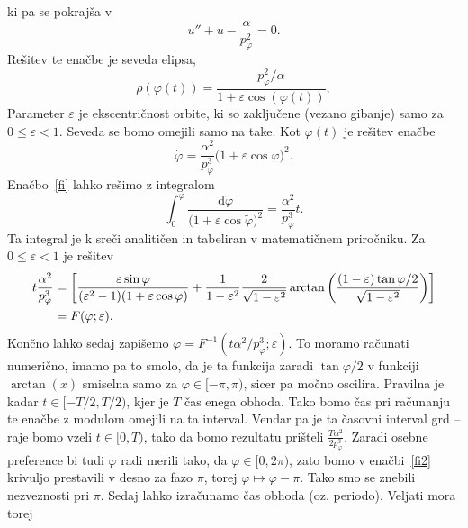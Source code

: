 \documentclass[12pt, a4paper]{article}
\renewcommand{\d}{
    \ensuremath{\mathrm{d}}
}
\begin{document}
ki pa se pokraj\v sa v
\begin{equation}
    u'' + u - \frac{\alpha}{p^2_\varphi} = 0.
\end{equation}
Re\v sitev te ena\v cbe je seveda elipsa,
\begin{equation}
    \rho(\varphi(t)) = \frac{p_\varphi^2/\alpha}{1 + \varepsilon\cos(\varphi(t))},
\end{equation}
Parameter $\varepsilon$ je ekscentri\v cnost orbite, ki so zaklju\v cene (vezano gibanje) samo za
$0 \leq \varepsilon < 1$. Seveda se bomo omejili samo na take.
Kot $\varphi(t)$ je re\v sitev ena\v cbe
\begin{equation}
    \dot{\varphi} = \frac{\alpha^2}{p_\varphi^3}\big(1 + \varepsilon\cos\varphi\big)^2.
    \label{fi}
\end{equation}
Ena\v cbo~\eqref{fi} lahko re\v simo z integralom
\begin{equation}
    \int_0^{\varphi}\frac{\d \tilde{\varphi}}{\big(1 + \varepsilon\cos\tilde{\varphi}\big)^2} = \frac{\alpha^2}{p_\varphi^3}t.
\end{equation}
Ta integral je k sre\v ci analiti\v cen in tabeliran v matemati\v cnem priro\v cniku. Za $0 \leq \varepsilon < 1$ je
re\v sitev
\begin{align}
    t\frac{\alpha^2}{p^3_\varphi} &= \bigg[\frac{\varepsilon\sin\varphi}{(\varepsilon^2 - 1)(1 + \varepsilon\cos\varphi)}
            +\frac{1}{1 - \varepsilon^2}\frac{2}{\sqrt{1 - \varepsilon^2}}\arctan\bigg(\frac{(1 - \varepsilon)\tan\varphi/2}
            {\sqrt{1 - \varepsilon^2}}\bigg)\bigg] \notag \\
        &= F(\varphi; \varepsilon).
    \label{fi2}
\end{align}
Kon\v cno lahko sedaj zapi\v semo $\varphi = F^{-1}(t\alpha^2/p^3_\varphi; \varepsilon)$. To moramo ra\v cunati
numeri\v cno, imamo pa to smolo, da je ta funkcija zaradi $\tan\varphi/2$ v funkciji $\arctan(x)$ smiselna samo za
$\varphi \in [-\pi,\pi)$, sicer pa mo\v cno oscilira. Pravilna je kadar $t \in [-T/2, T/2)$, kjer je $T$ \v cas enega
obhoda. Tako bomo \v cas pri ra\v cunanju te ena\v cbe z modulom omejili na ta interval. Vendar pa je ta \v casovni
interval grd -- raje bomo vzeli $t \in [0, T)$, tako da bomo rezultatu pri\v steli $\frac{T\alpha^2}{2p^3_\varphi}$.
Zaradi osebne preference bi tudi $\varphi$ radi merili tako, da $\varphi \in [0, 2\pi)$, zato bomo v ena\v cbi~\eqref{fi2}
krivuljo prestavili v desno za fazo $\pi$, torej $\varphi \mapsto \varphi - \pi$. Tako smo se znebili nezveznosti pri
$\pi$. Sedaj lahko izra\v cunamo \v cas obhoda (oz. periodo). Veljati mora torej
\end{document}
